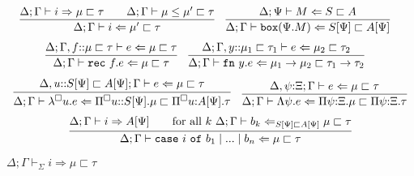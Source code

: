 \documentclass[letterpaper, 11pt]{article}
\newcommand{\Rar}{\Rightarrow}
\newcommand{\Lar}{\Leftarrow}
\newcommand{\rar}{\rightarrow}
\newcommand{\rec}{\texttt{rec}}
\newcommand{\fn}{\texttt{fn}}
\newcommand{\case}{\texttt{case}}
\newcommand{\of}{\texttt{of}}
\newcommand{\bbox}{\texttt{box}}
\begin{document}
    \begin{align*}
      & \infer{ \Delta; \Gamma \vdash i \Lar \mu' \sqsubset \tau}
        {
           \Delta; \Gamma \vdash i \Rar \mu \sqsubset \tau
          &&
           \Delta; \Gamma \vdash \mu \leq \mu' \sqsubset \tau
        } &
      & \infer{ \Delta; \Gamma \vdash \bbox(\Psi. M) \Lar S[\Psi] \sqsubset A[\Psi]}
        {
           \Delta; \Psi \vdash M \Lar S \sqsubset A
        }
    \end{align*}
    \begin{align*}
      & \infer{ \Delta; \Gamma \vdash \rec \ f.e \Lar \mu \sqsubset \tau}
        {
           \Delta; \Gamma, f{::}\mu \sqsubset \tau \vdash e \Lar \mu \sqsubset \tau
        } &
      & \infer{ \Delta; \Gamma \vdash \fn \ y.e \Lar \mu_1 \rar \mu_2 \sqsubset \tau_1 \rar \tau_2}
        {
           \Delta; \Gamma, y{::}\mu_1 \sqsubset \tau_1 \vdash e \Lar \mu_2 \sqsubset \tau_2
        }
    \end{align*}
    \begin{align*}
      & \infer{ \Delta; \Gamma \vdash \lambda^\square u.e \Lar \Pi^\square u{::}S[\Psi].\mu \sqsubset \Pi^\square u{:}A[\Psi]. \tau}
        {
           \Delta, u{::}S[\Psi] \sqsubset A[\Psi]; \Gamma \vdash e \Lar \mu \sqsubset \tau
        }
      & \infer{ \Delta; \Gamma \vdash \Lambda \psi. e \Lar \Pi \psi{:}\Xi.\mu \sqsubset \Pi \psi {:} \Xi. \tau}
        {
          \Delta, \psi{:}\Xi; \Gamma \vdash e \Lar \mu \sqsubset \tau
        }
    \end{align*}
    \begin{align*}
      \infer{ \Delta; \Gamma \vdash \case \ i \ \of \ b_1 \mid ... \mid b_n \Lar \mu \sqsubset \tau}
            {
               \Delta; \Gamma \vdash i \Rar A[\Psi]
              &&
              \text{for all } k \  \Delta; \Gamma \vdash b_k \Lar_{S[\Psi] \sqsubset A[\Psi]} \mu \sqsubset \tau
            }
    \end{align*}

    $\boxed{ \Delta; \Gamma \vdash_\Sigma i \Rar \mu \sqsubset \tau}$
    
\end{document}
